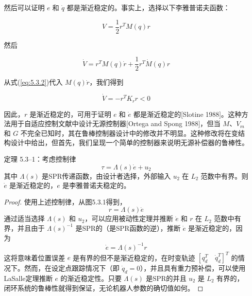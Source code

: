 \documentclass[UTF8,12pt,a4paper]{ctexart}
\begin{document}
然后可以证明 $e$ 和 $\dot{q}$ 都是渐近稳定的。事实上，选择以下李雅普诺夫函数：

\begin{equation}
V = \frac{1}{2}r^T M(q)r
\end{equation}

然后

\begin{equation}
\dot{V} = r^T M(q)\dot{r} + \frac{1}{2}r^T \dot{M}(q)r
\end{equation}

从式(\ref{eq:5.3.2})代入 $M(q)\dot{r}$，我们得到

\begin{equation}
\dot{V} = -r^T K_r r < 0
\end{equation}

因此，$r$ 是渐近稳定的，可用于证明 $e$ 和 $\dot{e}$ 都是渐近稳定的[Slotine 1988]。这种方法用于自适应控制文献中设计无源控制器[Ortega and Spong 1988]，但当 $M$、$V_m$ 和 $G$ 不完全已知时，其在鲁棒控制器设计中的修改并不明显。这种修改将在变结构设计中给出，但首先，我们呈现一个简单的控制器来说明无源补偿器的鲁棒性。

\begin{theorem}\label{thm:5.3.1}
定理 5.3--1：考虑控制律
\begin{equation}
\tau = \Lambda(s)\dot{e} + u_2
\end{equation}
其中 $\Lambda(s)$ 是SPR传递函数，由设计者选择，外部输入 $u_2$ 在 $L_2$ 范数中有界。则 $\dot{e}$ 是渐近稳定的，$e$ 是李雅普诺夫稳定的。
\end{theorem}

\begin{proof}
使用上述控制律，从图5.3.1得到，
\begin{equation}
r = \Lambda(s)\dot{e}
\end{equation}
通过适当选择 $\Lambda(s)$ 和 $u_2$，可以应用被动性定理并推断 $\dot{e}$ 和 $r$ 在 $L_2$ 范数中有界，并且由于 $\Lambda(s)^{-1}$ 是SPR的（是SPR函数的逆），推断 $\dot{e}$ 是渐近稳定的，因为
\begin{equation}
\dot{e} = \Lambda(s)^{-1}r
\end{equation}
这将意味着位置误差 $e$ 是有界的但不是渐近稳定的，在时变轨迹 $[q_d^T \quad \dot{q}_d^T]^T$ 的情况下。然而，在设定点跟踪情况下（即 $\dot{q}_d = 0$），并且具有重力预补偿，可以使用LaSalle定理推断 $e$ 的渐近稳定性。只要 $\Lambda(s)$ 是SPR的并且 $u_2$ 是 $L_2$ 有界的，闭环系统的鲁棒性就得到保证，无论机器人参数的确切值如何。
\end{proof}
\end{document}
